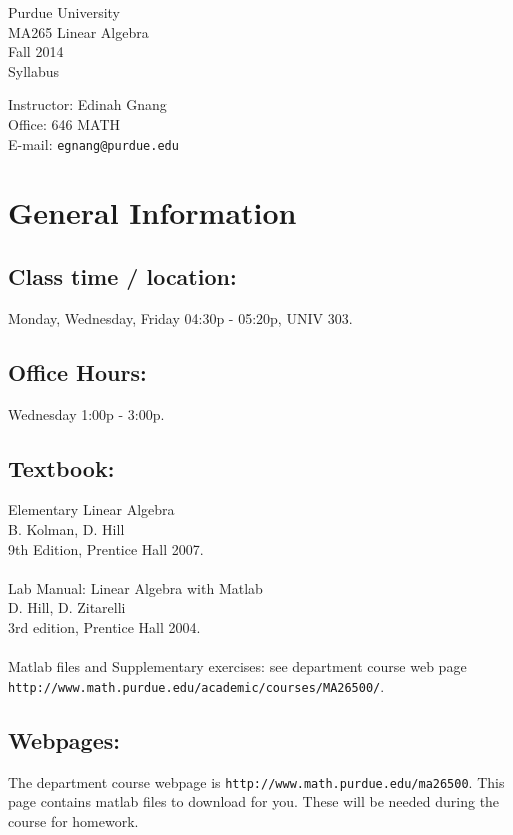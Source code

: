 \documentclass[10pt]{article}
\begin{document}
\noindent\parbox{7cm}{\large Purdue University\\
                    MA265 Linear Algebra\\
                    Fall 2014\\
                    Syllabus}
\hfill
\parbox{7cm}{\large Instructor: Edinah Gnang\\
                    Office: 646 MATH\\
                    E-mail: {\tt egnang@purdue.edu}}

\section{General Information}

\subsection{Class time / location:}
        Monday, Wednesday, Friday 04:30p - 05:20p, UNIV 303.

\subsection{Office Hours:}   
                Wednesday 1:00p - 3:00p.	

\subsection{Textbook:}
                Elementary Linear Algebra\\
                B. Kolman, D. Hill\\
		9th Edition, Prentice Hall 2007.\\
\\
                Lab Manual: Linear Algebra with Matlab\\
		D. Hill, D. Zitarelli\\
		3rd edition, Prentice Hall 2004.\\
\\
                Matlab files and Supplementary exercises: see
                department course web page {\tt http://www.math.purdue.edu/academic/courses/MA26500/}.
\subsection{Webpages:}
\noindent The department course webpage is {\tt http://www.math.purdue.edu/ma26500}. \smallskip
This page contains matlab files to
download for you. These will be needed during the course for
homework.\smallskip
\end{document}
